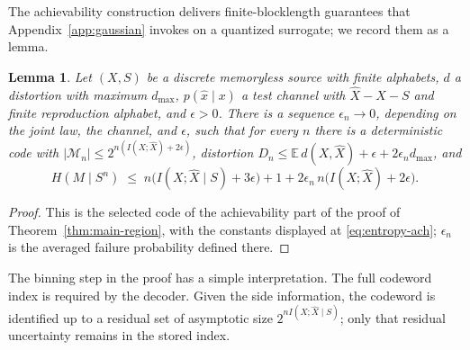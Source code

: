 \documentclass[11pt,onecolumn]{IEEEtran}
\newtheorem{lemma}[theorem]{Lemma}
\newcommand{\E}{\mathbb{E}}
\newcommand{\hX}{\widehat{X}}
\begin{document}
The achievability construction delivers finite-blocklength guarantees
that Appendix~\ref{app:gaussian} invokes on a quantized surrogate; we
record them as a lemma.

\begin{lemma}\label{lem:construction}
Let $(X,S)$ be a discrete memoryless source with finite alphabets, $d$ a
distortion with maximum $d_{\max}$, $p(\hat x\mid x)$ a test channel
with $\hX-X-S$ and finite reproduction alphabet, and $\epsilon>0$. There
is a sequence $\epsilon_n\to0$, depending on the joint law, the channel,
and $\epsilon$, such that for every $n$ there is a deterministic code
with $|\mathcal M_n|\le2^{n(I(X;\hX)+2\epsilon)}$, distortion
$D_n\le\E\,d(X,\hX)+\epsilon+2\epsilon_nd_{\max}$, and
\[
H(M\mid S^n)\;\le\;n\bigl(I(X;\hX\mid S)+3\epsilon\bigr)
+1+2\epsilon_n\,n\bigl(I(X;\hX)+2\epsilon\bigr).
\]
\end{lemma}

\begin{proof}
This is the selected code of the achievability part of the proof of
Theorem~\ref{thm:main-region}, with the constants displayed at
\eqref{eq:entropy-ach}; $\epsilon_n$ is the averaged failure
probability defined there.
\end{proof}

The binning step in the proof has a simple interpretation. The full codeword
index is required by the decoder. Given the side information, the codeword
is identified up to a residual set of asymptotic size $2^{nI(X;\hX\mid S)}$; only
that residual uncertainty remains in the stored index.
\end{document}

